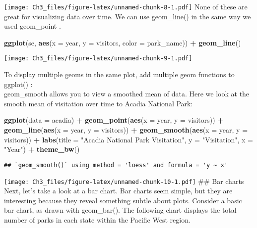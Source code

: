 \documentclass[
]{article}
\newenvironment{Shaded}{\begin{snugshade}}{\end{snugshade}}
\newcommand{\AttributeTok}[1]{\textcolor[rgb]{0.13,0.29,0.53}{#1}}
\newcommand{\FunctionTok}[1]{\textcolor[rgb]{0.13,0.29,0.53}{\textbf{#1}}}
\newcommand{\NormalTok}[1]{#1}
\newcommand{\SpecialCharTok}[1]{\textcolor[rgb]{0.81,0.36,0.00}{\textbf{#1}}}
\newcommand{\StringTok}[1]{\textcolor[rgb]{0.31,0.60,0.02}{#1}}
\begin{document}
\texttt{[image: Ch3\_files/figure-latex/unnamed-chunk-8-1.pdf]} None of
these are great for visualizing data over time. We can use geom\_line()
in the same way we used geom\_point .

\begin{Shaded}
\begin{Highlighting}[]
 \FunctionTok{ggplot}\NormalTok{(se, }\FunctionTok{aes}\NormalTok{(}\AttributeTok{x =}\NormalTok{ year, }\AttributeTok{y =}\NormalTok{ visitors, }\AttributeTok{color =}\NormalTok{ park\_name)) }\SpecialCharTok{+}
 \FunctionTok{geom\_line}\NormalTok{()}
\end{Highlighting}
\end{Shaded}

\texttt{[image: Ch3\_files/figure-latex/unnamed-chunk-9-1.pdf]}

To display multiple geoms in the same plot, add multiple geom functions
to ggplot() :\\
geom\_smooth allows you to view a smoothed mean of data. Here we look at
the smooth mean of visitation over time to Acadia National Park:

\begin{Shaded}
\begin{Highlighting}[]
\FunctionTok{ggplot}\NormalTok{(}\AttributeTok{data =}\NormalTok{ acadia) }\SpecialCharTok{+}
\FunctionTok{geom\_point}\NormalTok{(}\FunctionTok{aes}\NormalTok{(}\AttributeTok{x =}\NormalTok{ year, }\AttributeTok{y =}\NormalTok{ visitors)) }\SpecialCharTok{+}
\FunctionTok{geom\_line}\NormalTok{(}\FunctionTok{aes}\NormalTok{(}\AttributeTok{x =}\NormalTok{ year, }\AttributeTok{y =}\NormalTok{ visitors)) }\SpecialCharTok{+}
\FunctionTok{geom\_smooth}\NormalTok{(}\FunctionTok{aes}\NormalTok{(}\AttributeTok{x =}\NormalTok{ year, }\AttributeTok{y =}\NormalTok{ visitors)) }\SpecialCharTok{+}
\FunctionTok{labs}\NormalTok{(}\AttributeTok{title =} \StringTok{"Acadia National Park Visitation"}\NormalTok{,}
\AttributeTok{y =} \StringTok{"Visitation"}\NormalTok{,}
\AttributeTok{x =} \StringTok{"Year"}\NormalTok{) }\SpecialCharTok{+}
\FunctionTok{theme\_bw}\NormalTok{()}
\end{Highlighting}
\end{Shaded}

\begin{verbatim}
## `geom_smooth()` using method = 'loess' and formula = 'y ~ x'
\end{verbatim}

\texttt{[image: Ch3\_files/figure-latex/unnamed-chunk-10-1.pdf]} \#\# Bar
charts Next, let's take a look at a bar chart. Bar charts seem simple,
but they are interesting because they reveal something subtle about
plots. Consider a basic bar chart, as drawn with geom\_bar(). The
following chart displays the total number of parks in each state within
the Pacific West region.
\end{document}
